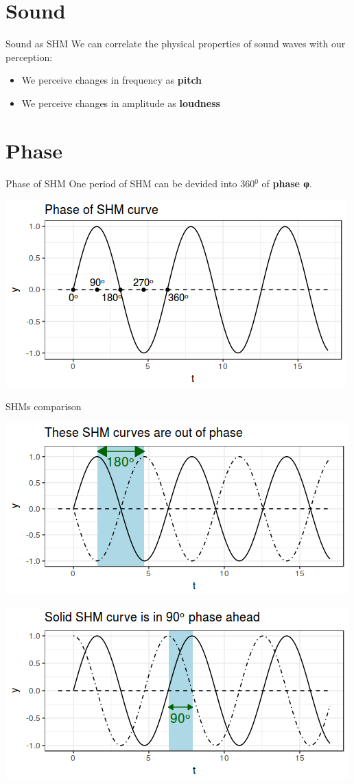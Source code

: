 \section{Sound}
\begin{frame}{Sound as SHM}
We can correlate the physical properties of sound waves with our perception:
\begin{itemize}
\item We perceive changes in frequency as \textbf{pitch}
\item We perceive changes in amplitude as \textbf{loudness}
\end{itemize}
\end{frame}

\section{Phase}
\begin{frame}{Phase of SHM}
One period of SHM can be devided into 360$^{0}$ of \textbf{phase φ}.\medskip\\
\vfill
\begin{center}
\includegraphics[width=0.7\linewidth]{06-Phase.png}
\end{center}
\end{frame}

\begin{frame}{SHMs comparison}
\begin{center}
\includegraphics[width=0.7\linewidth]{07-Out-of-Phase.png}
\end{center}
\begin{center}
\includegraphics[width=0.7\linewidth]{08-Phase-Ahead.png}
\end{center}
\end{frame}

